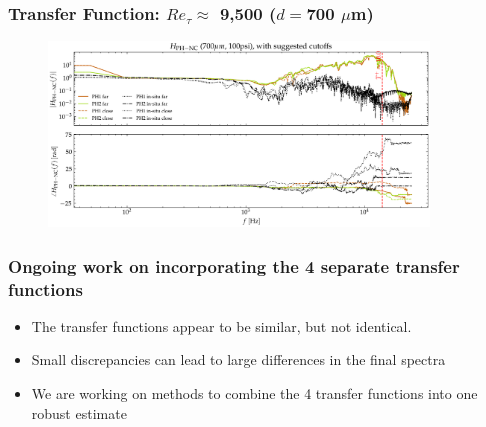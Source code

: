 \documentclass[aspectratio=169,9pt]{beamer}
\begin{document}



\begin{frame}
  \frametitle{Transfer Function: $Re_\tau \approx$ 9,500 ($d=$700 $\mu$m)}
  \begin{figure}
    \centering
    \includegraphics[width=0.9\textwidth]{tf_calib/700_100psi_H_2cal.png}
  \end{figure}
\end{frame}

\begin{frame}
  \frametitle{Ongoing work on incorporating the 4 separate transfer functions}
  \begin{itemize}
    \item The transfer functions appear to be similar, but not identical.
    \item Small discrepancies can lead to large differences in the final spectra
    \item We are working on methods to combine the 4 transfer functions into one robust estimate
  \end{itemize}
\end{frame}
\end{document}
